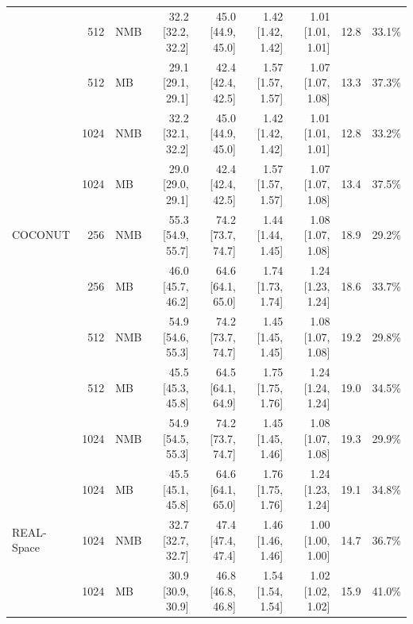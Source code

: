 \begin{table}[htbp]
{\begin{tabular}{@{}l r l r r r r r r@{}}
     & 512 & NMB & 32.2 [32.2, 32.2] & 45.0 [44.9, 45.0] & 1.42 [1.42, 1.42] & 1.01 [1.01, 1.01] & 12.8 & 33.1\% \\
     & 512 & MB & 29.1 [29.1, 29.1] & 42.4 [42.4, 42.5] & 1.57 [1.57, 1.57] & 1.07 [1.07, 1.08] & 13.3 & 37.3\% \\
     & 1024 & NMB & 32.2 [32.1, 32.2] & 45.0 [44.9, 45.0] & 1.42 [1.42, 1.42] & 1.01 [1.01, 1.01] & 12.8 & 33.2\% \\
     & 1024 & MB & 29.0 [29.0, 29.1] & 42.4 [42.4, 42.5] & 1.57 [1.57, 1.57] & 1.07 [1.07, 1.08] & 13.4 & 37.5\% \\
    \addlinespace
    COCONUT & 256 & NMB & 55.3 [54.9, 55.7] & 74.2 [73.7, 74.7] & 1.44 [1.44, 1.45] & 1.08 [1.07, 1.08] & 18.9 & 29.2\% \\
     & 256 & MB & 46.0 [45.7, 46.2] & 64.6 [64.1, 65.0] & 1.74 [1.73, 1.74] & 1.24 [1.23, 1.24] & 18.6 & 33.7\% \\
     & 512 & NMB & 54.9 [54.6, 55.3] & 74.2 [73.7, 74.7] & 1.45 [1.45, 1.45] & 1.08 [1.07, 1.08] & 19.2 & 29.8\% \\
     & 512 & MB & 45.5 [45.3, 45.8] & 64.5 [64.1, 64.9] & 1.75 [1.75, 1.76] & 1.24 [1.24, 1.24] & 19.0 & 34.5\% \\
     & 1024 & NMB & 54.9 [54.5, 55.3] & 74.2 [73.7, 74.7] & 1.45 [1.45, 1.46] & 1.08 [1.07, 1.08] & 19.3 & 29.9\% \\
     & 1024 & MB & 45.5 [45.1, 45.8] & 64.6 [64.1, 65.0] & 1.76 [1.75, 1.76] & 1.24 [1.23, 1.24] & 19.1 & 34.8\% \\
    \addlinespace
    REAL-Space & 1024 & NMB & 32.7 [32.7, 32.7] & 47.4 [47.4, 47.4] & 1.46 [1.46, 1.46] & 1.00 [1.00, 1.00] & 14.7 & 36.7\% \\
     & 1024 & MB & 30.9 [30.9, 30.9] & 46.8 [46.8, 46.8] & 1.54 [1.54, 1.54] & 1.02 [1.02, 1.02] & 15.9 & 41.0\% \\
    \bottomrule
  \end{tabular}%
  }
\end{table}
